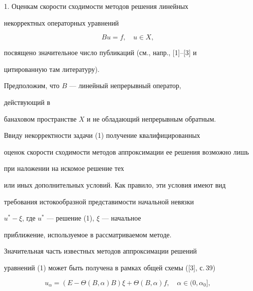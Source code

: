

\maketitle


\label{begin}











1. Оценкам скорости сходимости методов решения линейных


некорректных операторных уравнений


\begin{equation}


Bu=f, \quad u\in X,


\end{equation}


посвящено значительное число публикаций (см., напр., [1]--[3] и


цитированную там литературу).


Предположим, что $B$ --- линейный непрерывный оператор,


действующий в


банаховом пространстве $X$ и не обладающий непрерывным обратным.


Ввиду некорректности задачи (1) получение квалифицированных


оценок скорости сходимости методов аппроксимации ее решения возможно лишь


при наложении на искомое решение тех


или иных дополнительных условий. Как правило, эти условия имеют вид


требования истокообразной представимости начальной невязки


$u^* - \xi$, где $u^*$ --- решение (1), $\xi$ --- начальное


приближение, используемое в рассматриваемом методе.





Значительная часть известных методов аппроксимации решений


уравнений (1) может быть получена в рамках общей схемы ([3], с.\,39)


\begin{equation}


u_{\alpha} = (E - \Theta(B,\alpha) B)\xi + \Theta(B,\alpha)f,


\quad \alpha\in (0, \alpha_0],


\end{equation}


